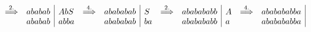 \[
\begin{array}{c r|l c r|l c r|l c r|}
    \stackrel{2.}{\Longrightarrow} & ababab & AbS & \stackrel{4.}{\Longrightarrow} &  abababab & S & \stackrel{2.}{\Longrightarrow} & ababababb & A & \stackrel{4.}{\Longrightarrow} & ababababba\\
    & ababab & abba & & abababab & ba & & ababababb & a & & ababababba \\
\end{array}
\]


     
